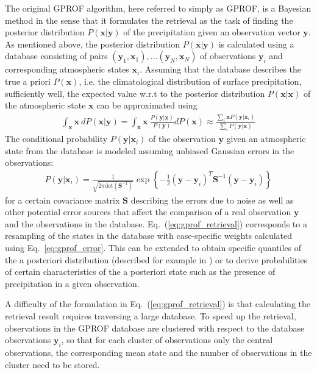 \documentclass[a4paper,11pt,bibtotoc]{scrartcl}
\begin{document}
The original GPROF algorithm, here referred to simply as GPROF, is a Bayesian
method in the sense that it formulates the retrieval as the task of finding the
posterior distribution $P(\mathbf{x} | \mathbf{y})$ of the precipitation given
an observation vector $\mathbf{y}$. As mentioned above, the posterior
distribution $P(\mathbf{x} | \mathbf{y})$ is calculated using a database
consisting of pairs $(\mathbf{y}_1, \mathbf{x}_1), \ldots (\mathbf{y}_N,
\mathbf{x}_N)$ of observations $\mathbf{y}_i$ and corresponding atmospheric
states $\mathbf{x}_i$. Assuming that the database describes the true a priori
$P(\mathbf{x})$, i.e. the climatological distribution of surface precipitation,
sufficiently well, the expected value w.r.t to the posterior distribution
$P(\mathbf{x} | \mathbf{x})$ of the atmospheric state $\mathbf{x}$ can be
approximated using
\begin{align}\label{eq:gprof_retrieval}
  \int_{\mathbf{x} } \mathbf{x}\: dP(\mathbf{x} | \mathbf{y}) =
  \int_{\mathbf{x} } \mathbf{x}\: \frac{P(\mathbf{y} | \mathbf{x})}{P(\mathbf{y})} dP(\mathbf{x}) \approx
  \frac{\sum_i \mathbf{x} P(\mathbf{y}|\mathbf{x}_i)}{\sum_i P(\mathbf{y}|\mathbf{x})}
\end{align}
The conditional probability $P(\mathbf{y} | \mathbf{x}_i)$ of the observation
$\mathbf{y}$ given an atmospheric state from the database is modeled assuming
  unbiased  Gaussian errors in the observations:
\begin{align}\label{eq:gprof_error}
  P(\mathbf{y}|\mathbf{x}_i) = \frac{1}{\sqrt{2\pi\text{det}(\mathbf{S}^{-1})}}
  \exp \left \{
  - \frac{1}{2}
  (\mathbf{y} - \mathbf{y}_i)^T \mathbf{S}^{-1}  (\mathbf{y} - \mathbf{y}_i)
  \right \}
\end{align}
for a certain covariance matrix $\mathbf{S}$ describing the errors due to noise
as well as other potential error sources that affect the comparison of a real
observation $\mathbf{y}$ and the observations in the database.
Eq.~(\ref{eq:gprof_retrieval}) corresponds to a resampling of the
states in the database with case-specific weights calculated using
Eq.~\ref{eq:gprof_error}. This can be extended to obtain specific quantiles of
the a posteriori distribution (described for example in \citet{pfreundschuh18})
or to derive probabilities of certain characteristics of the a posteriori state
such as the presence of precipitation in a given observation.

A difficulty of the formulation in Eq.~(\ref{eq:gprof_retrieval}) is that
calculating the retrieval result requires traversing a large database. To
speed up the retrieval, observations in the GPROF database are clustered
with respect to the database observations $\mathbf{y}_i$, so that for each
cluster of observations only the central observations, the corresponding
mean state and the number of observations in the cluster need to be stored.
\end{document}
